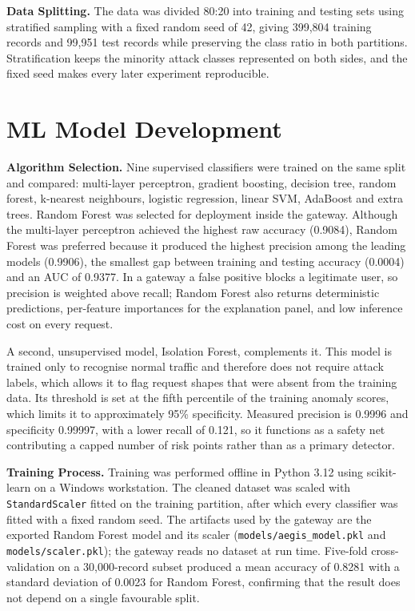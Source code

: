 \textbf{Data Splitting.} The data was divided 80:20 into training and testing sets using stratified sampling with a fixed random seed of 42, giving 399,804 training records and 99,951 test records while preserving the class ratio in both partitions. Stratification keeps the minority attack classes represented on both sides, and the fixed seed makes every later experiment reproducible.

\section{ML Model Development}

\textbf{Algorithm Selection.} Nine supervised classifiers were trained on the same split and compared: multi-layer perceptron, gradient boosting, decision tree, random forest, k-nearest neighbours, logistic regression, linear SVM, AdaBoost and extra trees. Random Forest was selected for deployment inside the gateway. Although the multi-layer perceptron achieved the highest raw accuracy (0.9084), Random Forest was preferred because it produced the highest precision among the leading models (0.9906), the smallest gap between training and testing accuracy (0.0004) and an AUC of 0.9377. In a gateway a false positive blocks a legitimate user, so precision is weighted above recall; Random Forest also returns deterministic predictions, per-feature importances for the explanation panel, and low inference cost on every request.

A second, unsupervised model, Isolation Forest, complements it. This model is trained only to recognise normal traffic and therefore does not require attack labels, which allows it to flag request shapes that were absent from the training data. Its threshold is set at the fifth percentile of the training anomaly scores, which limits it to approximately 95\% specificity. Measured precision is 0.9996 and specificity 0.99997, with a lower recall of 0.121, so it functions as a safety net contributing a capped number of risk points rather than as a primary detector.

\textbf{Training Process.} Training was performed offline in Python 3.12 using scikit-learn on a Windows workstation. The cleaned dataset was scaled with \texttt{StandardScaler} fitted on the training partition, after which every classifier was fitted with a fixed random seed. The artifacts used by the gateway are the exported Random Forest model and its scaler (\texttt{models/aegis\_model.pkl} and \texttt{models/scaler.pkl}); the gateway reads no dataset at run time. Five-fold cross-validation on a 30,000-record subset produced a mean accuracy of 0.8281 with a standard deviation of 0.0023 for Random Forest, confirming that the result does not depend on a single favourable split.


